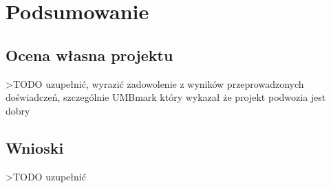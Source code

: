 \chapter{Podsumowanie}
\section{Ocena własna projektu}
>TODO uzupełnić, wyrazić zadowolenie z wyników przeprowadzonych doświadczeń, szczególnie UMBmark który wykazał że projekt podwozia jest dobry

\section{Wnioski}
>TODO uzupełnić
